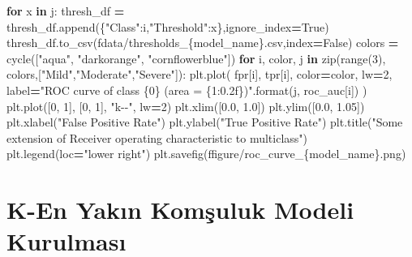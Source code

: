 \documentclass[12pt,twoside]{deuthesis}
\newenvironment{Shaded}{\begin{snugshade}}{\end{snugshade}}
\newcommand{\BuiltInTok}[1]{#1}
\newcommand{\ControlFlowTok}[1]{\textcolor[rgb]{0.13,0.29,0.53}{\textbf{#1}}}
\newcommand{\DecValTok}[1]{\textcolor[rgb]{0.00,0.00,0.81}{#1}}
\newcommand{\FloatTok}[1]{\textcolor[rgb]{0.00,0.00,0.81}{#1}}
\newcommand{\KeywordTok}[1]{\textcolor[rgb]{0.13,0.29,0.53}{\textbf{#1}}}
\newcommand{\NormalTok}[1]{#1}
\newcommand{\OperatorTok}[1]{\textcolor[rgb]{0.81,0.36,0.00}{\textbf{#1}}}
\newcommand{\SpecialCharTok}[1]{\textcolor[rgb]{0.00,0.00,0.00}{#1}}
\newcommand{\SpecialStringTok}[1]{\textcolor[rgb]{0.31,0.60,0.02}{#1}}
\newcommand{\StringTok}[1]{\textcolor[rgb]{0.31,0.60,0.02}{#1}}
\newcommand{\VariableTok}[1]{\textcolor[rgb]{0.00,0.00,0.00}{#1}}
\begin{document}
\begin{Shaded}
\begin{Highlighting}[]
        \ControlFlowTok{for}\NormalTok{ x }\KeywordTok{in}\NormalTok{ j:}
\NormalTok{            thresh\_df }\OperatorTok{=}\NormalTok{ thresh\_df.append(\{}\StringTok{"Class"}\NormalTok{:i,}\StringTok{"Threshold"}\NormalTok{:x\},ignore\_index}\OperatorTok{=}\VariableTok{True}\NormalTok{)}
\NormalTok{    thresh\_df.to\_csv(}\SpecialStringTok{f\textquotesingle{}data/thresholds\_}\SpecialCharTok{\{}\NormalTok{model\_name}\SpecialCharTok{\}}\SpecialStringTok{.csv\textquotesingle{}}\NormalTok{,index}\OperatorTok{=}\VariableTok{False}\NormalTok{)}
\NormalTok{    colors }\OperatorTok{=}\NormalTok{ cycle([}\StringTok{"aqua"}\NormalTok{, }\StringTok{"darkorange"}\NormalTok{, }\StringTok{"cornflowerblue"}\NormalTok{])}
    \ControlFlowTok{for}\NormalTok{ i, color, j }\KeywordTok{in} \BuiltInTok{zip}\NormalTok{(}\BuiltInTok{range}\NormalTok{(}\DecValTok{3}\NormalTok{), colors,[}\StringTok{"Mild"}\NormalTok{,}\StringTok{"Moderate"}\NormalTok{,}\StringTok{"Severe"}\NormalTok{]):}
\NormalTok{        plt.plot(}
\NormalTok{            fpr[i],}
\NormalTok{            tpr[i],}
\NormalTok{            color}\OperatorTok{=}\NormalTok{color,}
\NormalTok{            lw}\OperatorTok{=}\DecValTok{2}\NormalTok{,}
\NormalTok{            label}\OperatorTok{=}\StringTok{"ROC curve of class }\SpecialCharTok{\{0\}}\StringTok{ (area = }\SpecialCharTok{\{1:0.2f\}}\StringTok{)"}\NormalTok{.}\BuiltInTok{format}\NormalTok{(j, roc\_auc[i])}
\NormalTok{        )}
\NormalTok{    plt.plot([}\DecValTok{0}\NormalTok{, }\DecValTok{1}\NormalTok{], [}\DecValTok{0}\NormalTok{, }\DecValTok{1}\NormalTok{], }\StringTok{"k{-}{-}"}\NormalTok{, lw}\OperatorTok{=}\DecValTok{2}\NormalTok{)}
\NormalTok{    plt.xlim([}\FloatTok{0.0}\NormalTok{, }\FloatTok{1.0}\NormalTok{])}
\NormalTok{    plt.ylim([}\FloatTok{0.0}\NormalTok{, }\FloatTok{1.05}\NormalTok{])}
\NormalTok{    plt.xlabel(}\StringTok{"False Positive Rate"}\NormalTok{)}
\NormalTok{    plt.ylabel(}\StringTok{"True Positive Rate"}\NormalTok{)}
\NormalTok{    plt.title(}\StringTok{"Some extension of Receiver operating characteristic to multiclass"}\NormalTok{)}
\NormalTok{    plt.legend(loc}\OperatorTok{=}\StringTok{"lower right"}\NormalTok{)}
\NormalTok{    plt.savefig(}\SpecialStringTok{f\textquotesingle{}figure/roc\_curve\_}\SpecialCharTok{\{}\NormalTok{model\_name}\SpecialCharTok{\}}\SpecialStringTok{.png\textquotesingle{}}\NormalTok{)}
\end{Highlighting}
\end{Shaded}
\normalsize

\hypertarget{k-en-yakux131n-komux15fuluk-modeli-kurulmasux131}{%
\section{K-En Yakın Komşuluk Modeli Kurulması}\label{k-en-yakux131n-komux15fuluk-modeli-kurulmasux131}}
\end{document}
